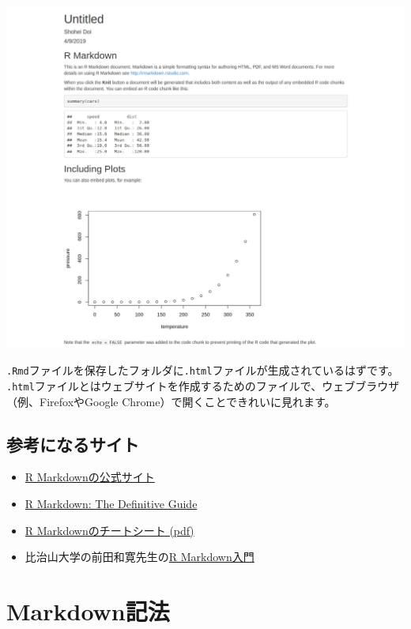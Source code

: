 \documentclass[]{bxjsreport}
\providecommand{\tightlist}{%
  \setlength{\itemsep}{0pt}\setlength{\parskip}{0pt}}
\let\asdf\section
\renewcommand{\section}{\chapter}
\let\asdff\subsection
\renewcommand{\subsection}{\asdf}
\renewcommand{\subsubsection}{\asdff}
\begin{document}
\includegraphics{figures/rmarkdown_html4.jpg}

\texttt{.Rmd}ファイルを保存したフォルダに\texttt{.html}ファイルが生成されているはずです。
\texttt{.html}ファイルとはウェブサイトを作成するためのファイルで、ウェブブラウザ（例、FirefoxやGoogle Chrome）で開くことできれいに見れます。

\hypertarget{ux53c2ux8003ux306bux306aux308bux30b5ux30a4ux30c8}{%
\subsubsection{参考になるサイト}\label{ux53c2ux8003ux306bux306aux308bux30b5ux30a4ux30c8}}

\begin{itemize}
\tightlist
\item
  \href{https://rmarkdown.rstudio.com/}{R Markdownの公式サイト}
\item
  \href{https://bookdown.org/yihui/rmarkdown/}{R Markdown: The Definitive Guide}
\item
  \href{https://www.rstudio.com/wp-content/uploads/2015/02/rmarkdown-cheatsheet.pdf}{R Markdownのチートシート (pdf)}
\item
  比治山大学の前田和寛先生の\href{https://kazutan.github.io/kazutanR/Rmd_intro.html}{R Markdown入門}
\end{itemize}

\hypertarget{Markdown}{%
\subsection{Markdown記法}\label{Markdown}}
\end{document}
